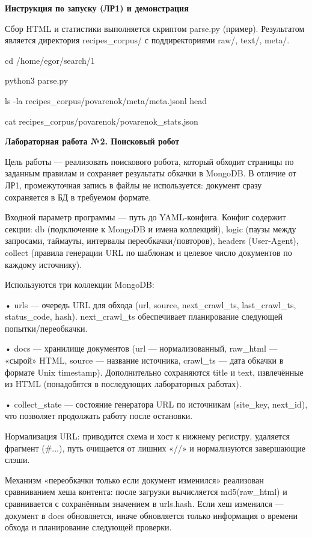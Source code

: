\documentclass[12pt,a4paper]{article}
\begin{document}
\textbf{Инструкция по запуску (ЛР1) и демонстрация}

Сбор HTML и статистики выполняется скриптом parse.py (пример).
Результатом является директория recipes\_corpus/ с поддиректориями raw/,
text/, meta/.

cd /home/egor/search/1

python3 parse.py

ls -la recipes\_corpus/povarenok/meta/meta.jsonl \textbar{} head

cat recipes\_corpus/povarenok/povarenok\_stats.json

\textbf{Лабораторная работа №2. Поисковый робот}

Цель работы --- реализовать поискового робота, который обходит страницы
по заданным правилам и сохраняет результаты обкачки в MongoDB. В отличие
от ЛР1, промежуточная запись в файлы не используется: документ сразу
сохраняется в БД в требуемом формате.

Входной параметр программы --- путь до YAML-конфига. Конфиг содержит
секции: db (подключение к MongoDB и имена коллекций), logic (паузы между
запросами, таймауты, интервалы переобкачки/повторов), headers
(User-Agent), collect (правила генерации URL по шаблонам и целевое число
документов по каждому источнику).

Используются три коллекции MongoDB:

• urls --- очередь URL для обхода (url, source, next\_crawl\_ts,
last\_crawl\_ts, status\_code, hash). next\_crawl\_ts обеспечивает
планирование следующей попытки/переобкачки.

• docs --- хранилище документов (url --- нормализованный, raw\_html ---
«сырой» HTML, source --- название источника, crawl\_ts --- дата обкачки
в формате Unix timestamp). Дополнительно сохраняются title и text,
извлечённые из HTML (понадобятся в последующих лабораторных работах).

• collect\_state --- состояние генератора URL по источникам (site\_key,
next\_id), что позволяет продолжать работу после остановки.

Нормализация URL: приводится схема и хост к нижнему регистру, удаляется
фрагмент (\#...), путь очищается от лишних «//» и нормализуются
завершающие слэши.

Механизм «переобкачки только если документ изменился» реализован
сравниванием хеша контента: после загрузки вычисляется md5(raw\_html) и
сравнивается с сохранённым значением в urls.hash. Если хеш изменился ---
документ в docs обновляется, иначе обновляется только информация о
времени обхода и планирование следующей проверки.
\end{document}
